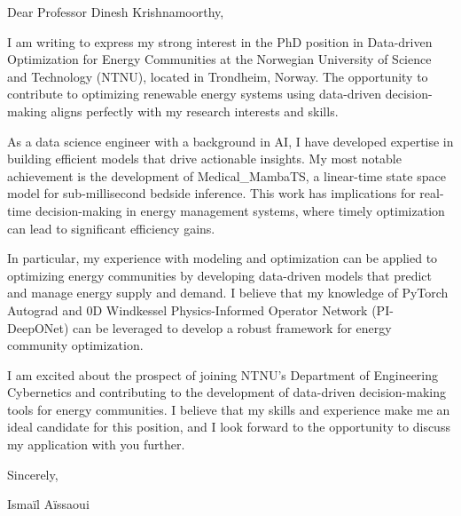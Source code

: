 \documentclass{letter}
\begin{document}
\opening{\noindent Dear Professor Dinesh Krishnamoorthy,}

I am writing to express my strong interest in the PhD position in Data-driven Optimization for Energy Communities at the Norwegian University of Science and Technology (NTNU), located in Trondheim, Norway. The opportunity to contribute to optimizing renewable energy systems using data-driven decision-making aligns perfectly with my research interests and skills.

As a data science engineer with a background in AI, I have developed expertise in building efficient models that drive actionable insights. My most notable achievement is the development of Medical_MambaTS, a linear-time state space model for sub-millisecond bedside inference. This work has implications for real-time decision-making in energy management systems, where timely optimization can lead to significant efficiency gains.

In particular, my experience with modeling and optimization can be applied to optimizing energy communities by developing data-driven models that predict and manage energy supply and demand. I believe that my knowledge of PyTorch Autograd and 0D Windkessel Physics-Informed Operator Network (PI-DeepONet) can be leveraged to develop a robust framework for energy community optimization.

I am excited about the prospect of joining NTNU's Department of Engineering Cybernetics and contributing to the development of data-driven decision-making tools for energy communities. I believe that my skills and experience make me an ideal candidate for this position, and I look forward to the opportunity to discuss my application with you further.

\closing{\noindent Sincerely,}

Ismaïl Aïssaoui
\end{document}
